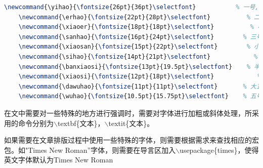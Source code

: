\documentclass[12pt]{book}
\begin{document}
\begin{lstlisting}[language=tex,breaklines]
	\newcommand{\yihao}{\fontsize{26pt}{36pt}\selectfont}           % 一号, 1.4 倍行距
	\newcommand{\erhao}{\fontsize{22pt}{28pt}\selectfont}          % 二号, 1.25倍行距
	\newcommand{\xiaoer}{\fontsize{18pt}{18pt}\selectfont}          % 小二, 单倍行距
	\newcommand{\sanhao}{\fontsize{16pt}{24pt}\selectfont}        % 三号, 1.5倍行距
	\newcommand{\xiaosan}{\fontsize{15pt}{22pt}\selectfont}        % 小三, 1.5倍行距
	\newcommand{\sihao}{\fontsize{14pt}{21pt}\selectfont}            % 四号, 1.5 倍行距
	\newcommand{\banxiaosi}{\fontsize{13pt}{19.5pt}\selectfont}    % 半小四, 1.5倍行距
	\newcommand{\xiaosi}{\fontsize{12pt}{18pt}\selectfont}            % 小四, 1.5倍行距
	\newcommand{\dawuhao}{\fontsize{11pt}{11pt}\selectfont}       % 大五号, 单倍行距
	\newcommand{\wuhao}{\fontsize{10.5pt}{15.75pt}\selectfont}    % 五号, 单倍行距
\end{lstlisting}

在文中需要对一些特殊的地方进行强调时，需要对字体进行加粗或斜体处理，所采用的命令分别为$\backslash$textbf\{文本\}，$\backslash$textit\{文本\}。


如果需要在文章排版过程中使用一些特殊的字体，则需要根据需求来查找相应的宏包。如"Times New Roman”字体，则需要在导言区加入$\backslash$usepackage\{times\}，使得英文字体默认为Times New Roman
\end{document}
